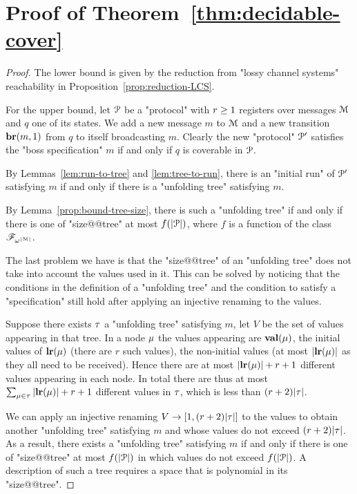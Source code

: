 \section{Proof of Theorem~\ref{thm:decidable-cover}}
\label{app:decidability}


\decidablecover*

\begin{proof}
	The lower bound is given by the reduction from "lossy channel systems" reachability in Proposition~\ref{prop:reduction-LCS}.
	
	For the upper bound, let $\mathcal{P}$ be a "protocol" with $r \geq 1$ registers over messages $\mathcal{M}$ and $q$ one of its states. We add a new message $m$ to $\mathcal{M}$ and a new transition $\textbf{br}(m, 1)$ from $q$ to itself broadcasting $m$. 
	Clearly the new "protocol" $\mathcal{P}'$ satisfies the "boss specification" $m$ if and only if $q$ is coverable in $\mathcal{P}$.
	
	By Lemmas~\ref{lem:run-to-tree} and \ref{lem:tree-to-run}, there is an "initial run" of $\mathcal{P}'$ satisfying $m$ if and only if there is a "unfolding tree" satisfying $m$.

	By Lemma~\ref{prop:bound-tree-size}, there is such a "unfolding tree" if and only if there is one of "size@@tree" at most $f(|\mathcal{P}|)$, where $f$ is a function of the class $\mathscr{F}_{\omega^{|\mathcal{M}|}}$.
	
	The last problem we have is that the "size@@tree" of an "unfolding tree" does not take into account the values used in it. This can be solved by noticing that the conditions in the definition of a "unfolding tree" and the condition to satisfy a "specification" still hold after applying an injective renaming to the values. 
	
	Suppose there exists $\tau$ a "unfolding tree" satisfying $m$, let $V$ be the set of values appearing in that tree. In a node $\mu$ the values appearing are $\mathbf{val}(\mu)$, the initial values of $\mathbf{lr}(\mu)$ (there are $r$ such values), the non-initial values (at most $|\mathbf{lr}(\mu)|$ as they all need to be received).
	Hence there are at most $|\mathbf{lr}(\mu)| + r +1$ different values appearing in each node.
	In total there are thus at most $\sum_{\mu \in \tau} |\mathbf{lr}(\mu)| + r +1$ different values in $\tau$, which is less than $(r+2)|\tau|$.
	
	We can apply an injective renaming $V \to [1,(r+2)|\tau|]$ to the values to obtain another "unfolding tree" satisfying $m$ and whose values do not exceed $(r+2)|\tau|$.
	As a result, there exists a "unfolding tree" satisfying $m$ if and only if there is one of "size@@tree" at most $f(|\mathcal{P}|)$ in which values do not exceed $f(|\mathcal{P}|)$. A description of such a tree requires a space that is polynomial in its "size@@tree".
	

\end{proof}
